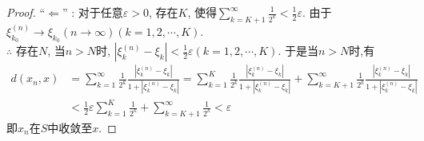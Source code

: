 \documentclass[lang=cn,10pt]{gorgeousnbook}
\numberwithin{equation}{section}%
\numberwithin{figure}{section}%
\begin{document}
\begin{proof}
“$\Longleftarrow $” : 对于任意$\varepsilon>0$, 存在$K$, 使得$\sum_{k=K+1}^{\infty}{\frac{1}{2^k}<\frac{1}{2}}\varepsilon$.
由于$\xi _{k_0}^{\left( n \right)}\rightarrow \xi _{k_0}\left( n\rightarrow \infty \right)(k=1,2,\cdots,K)$.\\
$\therefore $ 存在$N$, 当$n>N$时, $\left| \xi _{k}^{\left( n \right)}-\xi _k \right|<\frac{1}{2}\varepsilon \left( k=1,2,\cdots ,K \right) $.
于是当$n>N$时,有\\
\begin{equation}
  \begin{aligned}
  d\left( x_n,x \right) &=\sum_{k=1}^{\infty}{\frac{1}{2^k}\frac{\left| \xi _{k}^{\left( n \right)}-\xi _k \right|}{1+\left| \xi _{k}^{\left( n \right)}-\xi _k \right|}}=\sum_{k=1}^K{\frac{1}{2^k}\frac{\left| \xi _{k}^{\left( n \right)}-\xi _k \right|}{1+\left| \xi _{k}^{\left( n \right)}-\xi _k \right|}}+\sum_{k=K+1}^{\infty}{\frac{1}{2^k}\frac{\left| \xi _{k}^{\left( n \right)}-\xi _k \right|}{1+\left| \xi _{k}^{\left( n \right)}-\xi _k \right|}} \\
  &<\frac{1}{2}\varepsilon \sum_{k=1}^K{\frac{1}{2^k}+\sum_{k=K+1}^{\infty}{\frac{1}{2^k}<\varepsilon}}
  \nonumber 
  \end{aligned}
\end{equation}
即${x_n}$在$S$中收敛至$x$.
\end{proof}
\end{document}
